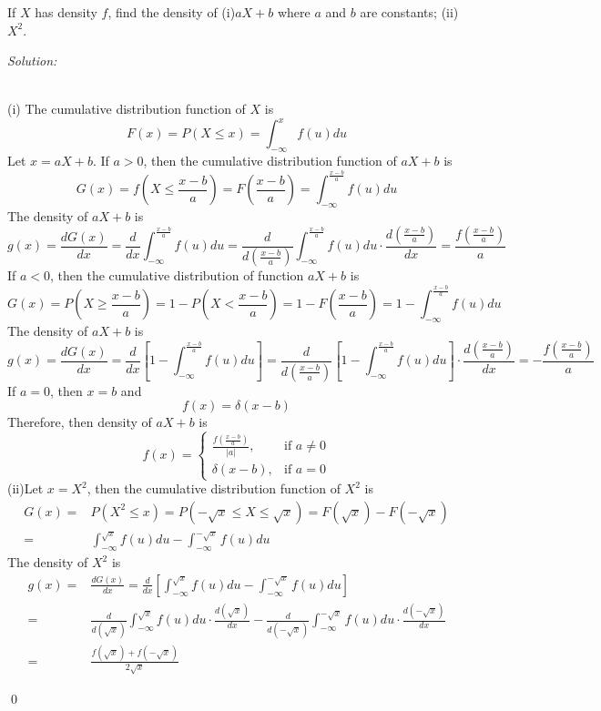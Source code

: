 \documentclass[12pt]{article}
\newenvironment{problem}[2][Problem]{\begin{trivlist}
\item[\hskip \labelsep {\bfseries #1}\hskip \labelsep {\bfseries #2.}]}{\end{trivlist}}
\newenvironment{sol}
    {\emph{Solution:}
    }
    {
    \qed
    }
\begin{document}
\begin{problem}{3}
If $X$ has density $f$, find the density of (i)$aX+b$ where $a$ and $b$ are constants; (ii) $X^2$.
\end{problem}
\begin{sol}
\\(i) The cumulative distribution function of $X$ is
\[
F(x)=P(X\leq x)=\int_{-\infty}^xf(u)du
\]
Let $x=aX+b$. If $a>0$, then the cumulative distribution function of $aX+b$ is
\[
G(x)=f(X\leq\frac{x-b}{a})=F(\frac{x-b}{a})=\int_{-\infty}^{\frac{x-b}{a}}f(u)du
\]
The density of $aX+b$ is
\[
g(x)=\frac{dG(x)}{dx}=\frac{d}{dx}\int_{-\infty}^{\frac{x-b}{a}}f(u)du=\frac{d}{d(\frac{x-b}{a})}\int_{-\infty}^{\frac{x-b}{a}}f(u)du\cdot\frac{d(\frac{x-b}{a})}{dx}=\frac{f(\frac{x-b}{a})}{a}
\]
If $a<0$, then the cumulative distribution of function $aX+b$ is
\[
G(x)=P(X\geq\frac{x-b}{a})=1-P(X<\frac{x-b}{a})=1-F(\frac{x-b}{a})=1-\int_{-\infty}^{\frac{x-b}{a}}f(u)du
\]
The density of $aX+b$ is
\[
g(x)=\frac{dG(x)}{dx}=\frac{d}{dx}[1-\int_{-\infty}^{\frac{x-b}{a}}f(u)du]=\frac{d}{d(\frac{x-b}{a})}[1-\int_{-\infty}^{\frac{x-b}{a}}f(u)du]\cdot\frac{d(\frac{x-b}{a})}{dx}=-\frac{f(\frac{x-b}{a})}{a}
\]
If $a=0$, then $x=b$ and
\[
f(x)=\delta(x-b)
\]
Therefore, then density of $aX+b$ is
\[
f(x)=
\left\{\begin{array}{ll}
\frac{f(\frac{x-b}{a})}{|a|},&\text{if }a\neq 0\\
\delta(x-b),&\text{if }a=0
\end{array}\right.
\]
(ii)Let $x=X^2$, then the cumulative distribution function of $X^2$ is
\begin{align*}
G(x)=&P(X^2\leq x)=P(-\sqrt{x}\leq X\leq\sqrt{x})=F(\sqrt{x})-F(-\sqrt{x})\\
=&\int_{-\infty}^{\sqrt{x}}f(u)du-\int_{-\infty}^{-\sqrt{x}}f(u)du
\end{align*}
The density of $X^2$ is
\begin{align*}
g(x)=&\frac{dG(x)}{dx}=\frac{d}{dx}[\int_{-\infty}^{\sqrt{x}}f(u)du-\int_{-\infty}^{-\sqrt{x}}f(u)du]\\
=&\frac{d}{d(\sqrt{x})}\int_{-\infty}^{\sqrt{x}}f(u)du\cdot\frac{d(\sqrt{x})}{dx}-\frac{d}{d(-\sqrt{x})}\int_{-\infty}^{-\sqrt{x}}f(u)du\cdot\frac{d(-\sqrt{x})}{dx}\\
=&\frac{f(\sqrt{x})+f(-\sqrt{x})}{2\sqrt{x}}
\end{align*}
\end{sol}
\end{document}
